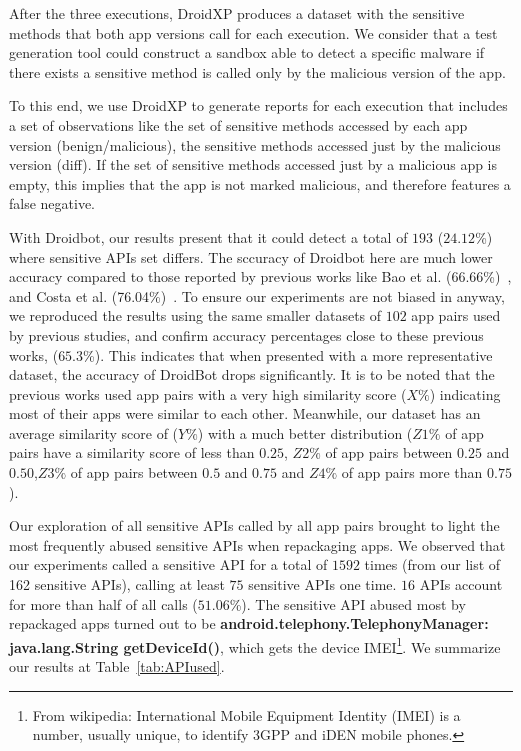 After the three executions, DroidXP produces a dataset with the sensitive methods that both app versions call for each execution. We consider that a test generation tool could construct a sandbox able to detect a specific malware if there exists a sensitive method is called only by the malicious version of the app. 

To this end, we use DroidXP to generate reports for each execution that includes a set of observations like the set of sensitive methods accessed by each app version (benign/malicious), the sensitive methods accessed just by the malicious version (diff). If the set of sensitive methods accessed just by a malicious app is empty, this implies that the app is not marked malicious, and therefore features a false negative.

With Droidbot, our results present that it could detect a total of $193$ ($24.12$\%) where sensitive APIs set differs. The sccuracy of Droidbot here are much lower accuracy compared to those reported by previous works like Bao et al. (66.66\%)~\cite{DBLP:conf/wcre/BaoLL18}, and Costa et al. (76.04\%)~\cite{DBLP:journals/jss/CostaMMSSBNR22}. To ensure our experiments are not biased in anyway, we reproduced the results using the same smaller datasets of $102$ app pairs used by previous studies, and confirm accuracy percentages close to these previous works, ($65.3$\%). This indicates that when presented with a more representative dataset, the accuracy of DroidBot drops significantly. It is to be noted that the previous works used app pairs with a very high similarity score ($X\%$) indicating most of their apps were similar to each other. Meanwhile, our dataset has an average similarity score of ($Y\%$) with a much better distribution ($Z1\%$ of app pairs have a similarity score of less than $0.25$, $Z2\%$ of app pairs between $0.25$ and $0.50$,$Z3\%$ of app pairs between $0.5$ and $0.75$  and $Z4\%$ of app pairs more than $0.75$). 

Our exploration of all sensitive APIs called by all app pairs brought to light the most frequently abused sensitive APIs when repackaging apps. We observed that our experiments called a sensitive API for a total of $1592$ times (from our list of 162 sensitive APIs), calling at least $75$ sensitive APIs one time. $16$ APIs account for more than half of all calls ($51.06$\%). The sensitive API abused most by repackaged apps turned out to be \textbf{android.telephony.TelephonyManager: java.lang.String getDeviceId()}, which gets the device IMEI\footnote{From wikipedia: International Mobile Equipment Identity (IMEI) is a number, usually unique, to identify 3GPP and iDEN mobile phones.}. We summarize our results at Table~\ref{tab:APIused}. 

